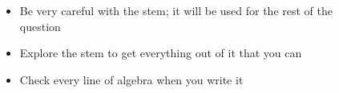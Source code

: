\documentclass[../main.tex]{subfile}
\begin{document}

\begin{figure}[h]
\centering
\begin{minipage}{0.85\linewidth}
\begin{itemize}
	\item Be very careful with the stem; it will be used for the rest of the question
	\item Explore the stem to get everything out of it that you can
	\item Check every line of algebra when you write it
\end{itemize}
\end{minipage}
\end{figure}
\end{document}
